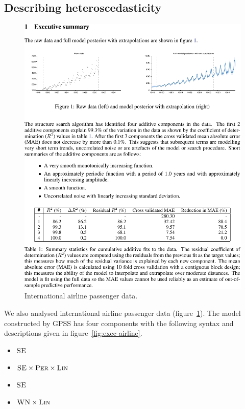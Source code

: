 \documentclass{article}
\begin{document}
\subsection{Describing heteroscedasticity}
\label{sec:airline}

\begin{figure}[h]
\centering
\includegraphics[trim=0cm 12.5cm 9cm 1.7cm, clip, width=0.98\columnwidth]{airlinepages/01-airline-separate-pages-2}
\caption{
International airline passenger data.}
\label{fig:airline}
\end{figure}

We also analysed international airline passenger data (figure~\ref{fig:airline}).
The model constructed by GPSS has four components with the following syntax and descriptions given in figure~\ref{fig:exec-airline}.
\vspace{-0.5\baselineskip}
\begin{itemize}
  \itemsep0em
  \item ${\textsc{SE}}$
  \item ${\textsc{SE}} \times {\textsc{Per}} \times {\textsc{Lin}}$
  \item ${\textsc{SE}}$
  \item ${\textsc{WN}} \times {\textsc{Lin}}$
\end{itemize}
\vspace{-\baselineskip}
\end{document}
